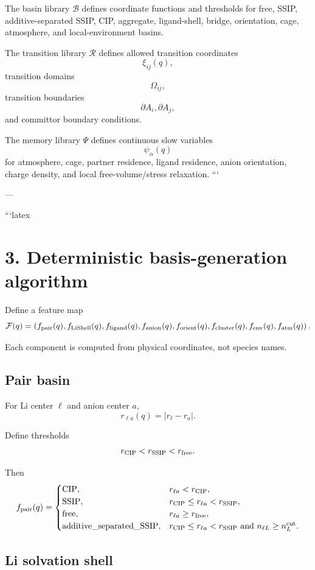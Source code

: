 The basin library \(\mathcal B\) defines coordinate functions and thresholds for
free, SSIP, additive-separated SSIP, CIP, aggregate, ligand-shell, bridge,
orientation, cage, atmosphere, and local-environment basins.

The transition library \(\mathcal R\) defines allowed transition coordinates
\[
\xi_{ij}(q),
\]
transition domains
\[
\Omega_{ij},
\]
transition boundaries
\[
\partial A_i,\partial A_j,
\]
and committor boundary conditions.

The memory library \(\mathcal \Psi\) defines continuous slow variables
\[
\psi_\alpha(q)
\]
for atmosphere, cage, partner residence, ligand residence, anion orientation,
charge density, and local free-volume/stress relaxation.
```

---

```latex
\section{3. Deterministic basis-generation algorithm}

Define a feature map
\[
\mathcal F(q)=
\left(
f_{\rm pair}(q),
f_{\rm LiShell}(q),
f_{\rm ligand}(q),
f_{\rm anion}(q),
f_{\rm orient}(q),
f_{\rm cluster}(q),
f_{\rm env}(q),
f_{\rm atm}(q)
\right).
\]

Each component is computed from physical coordinates, not species names.

\subsection{Pair basin}

For Li center \(\ell\) and anion center \(a\),
\[
r_{\ell a}(q)=|r_\ell-r_a|.
\]

Define thresholds
\[
r_{\rm CIP}<r_{\rm SSIP}<r_{\rm free}.
\]

Then
\[
f_{\rm pair}(q)=
\begin{cases}
{\rm CIP}, & r_{\ell a}<r_{\rm CIP},\\
{\rm SSIP}, & r_{\rm CIP}\le r_{\ell a}<r_{\rm SSIP},\\
{\rm free}, & r_{\ell a}\ge r_{\rm free},\\
{\rm additive\_separated\_SSIP}, &
r_{\rm CIP}\le r_{\ell a}<r_{\rm SSIP}
\text{ and } n_{\ell L}\ge n_L^{\rm cut}.
\end{cases}
\]

\subsection{Li solvation shell}

